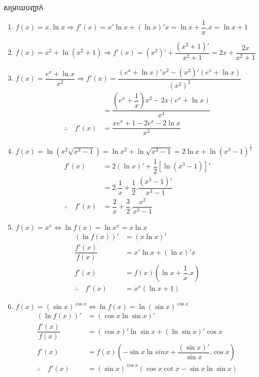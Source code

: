 \documentclass[12pt,fleqn]{book} %
\newcommand{\solution}{{\begin{center}\kml \color{magenta} សម្រាយបញ្ជាក់\end{center} }}
\begin{document}
\solution 
\begin{enumerate}
\item $f(x)=x.\ln x\Longrightarrow f'(x)=x'\ln x+(\ln x)' x=\ln x+\dfrac{1}{x}.x=\ln x+1$
\item $f(x)=x^2+\ln (x^2+1)\Longrightarrow f'(x)=(x^2)'+\dfrac{(x^2+1)'}{x^2+1}=2x+\dfrac{2x}{x^2+1}$
\item $f(x)=\dfrac{e^x+\ln x}{x^2}\Longrightarrow f'(x)=\dfrac{(e^x+\ln x)'x^2-(x^2)'(e^x+\ln x)}{(x^2)^2}$
\begin{align*}
&=\dfrac{\left(e^x+\dfrac{1}{x}\right)x^2-2x(e^x+\ln x)}{x^4}\\
\therefore \quad f'(x)&=\dfrac{xe^x+1-2e^x-2\ln x}{x^3}
\end{align*}
\item $f(x)=\ln (x^2 \sqrt{x^3-1})=\ln x^2 +\ln \sqrt{x^3-1}=2\ln x+ \ln (x^3-1)^{\frac{1}{2}}$
\begin{align*}
f'(x)&=2(\ln x)'+\dfrac{1}{2}[\ln (x^3-1)]'\\
&=2.\dfrac{1}{x}+\dfrac{1}{2}.\dfrac{(x^3-1)'}{x^3-1}\\
\therefore \quad f'(x)&=\dfrac{2}{x}+\dfrac{3}{2}.\dfrac{x^2}{x^3-1}
\end{align*}
\item $f(x)=x^x \Longleftrightarrow \ln f(x)=\ln x^x=x\ln x $
\begin{align*}
\left(\ln f(x)\right)'&=(x\ln x)'\\
\dfrac{f'(x)}{f(x)}&=x'\ln x+(\ln x)'x\\
f'(x)&=f(x)(\ln x+\dfrac{1}{x}.x)\\
\therefore \quad f'(x)&=x^x(\ln x+1)
\end{align*}
\item $f(x)=(\sin x)^{\cos x}\Longleftrightarrow \ln f(x)=\ln (\sin x)^{\cos x}$
\begin{align*}
\left(\ln f(x) \right)'&= (\cos x\ln \sin x)'\\
\dfrac{f'(x)}{f(x)}&=(\cos x)'\ln \sin x+(\ln \sin x)'\cos x\\
f'(x)&=f(x)\left(-\sin x\ln sin x+\dfrac{(\sin x)'}{\sin x}.\cos x \right)\\
\therefore \quad f'(x)&=(\sin x)^{\cos x} \left( \cos x\cot x-\sin x\ln \sin x\right)
\end{align*}
\end{enumerate}
\end{document}
